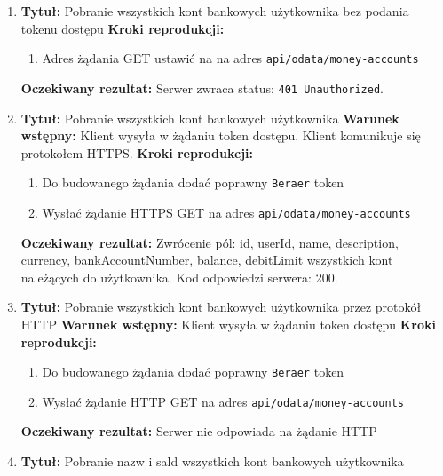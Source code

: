 \begin{enumerate}[labelwidth=1em,label=\Roman*]
\item 
    \textbf{Tytuł:} Pobranie wszystkich kont bankowych użytkownika bez podania tokenu dostępu \newline
    \textbf{Kroki reprodukcji:}  \begin{enumerate}[label=\arabic*.]
        \item Adres żądania GET ustawić na na adres \texttt{api/odata/money-accounts}
    \end{enumerate}
    \textbf{Oczekiwany rezultat:}  Serwer zwraca status: \texttt{401 Unauthorized}. \newline
\item 
    \textbf{Tytuł:} Pobranie wszystkich kont bankowych użytkownika \newline
    \textbf{Warunek wstępny:} Klient wysyła w żądaniu token dostępu. Klient komunikuje się protokołem HTTPS. \newline
    \textbf{Kroki reprodukcji:}  \begin{enumerate}[label=\arabic*.]
        \item Do budowanego żądania dodać poprawny \texttt{Beraer} token 
        \item Wysłać żądanie HTTPS GET na adres \texttt{api/odata/money-accounts}
    \end{enumerate}
    \textbf{Oczekiwany rezultat:}  Zwrócenie pól: id, userId, name, description, currency, bankAccountNumber, balance, debitLimit wszystkich kont należących do użytkownika. Kod odpowiedzi serwera: 200. \newline
\item 
    \textbf{Tytuł:} Pobranie wszystkich kont bankowych użytkownika przez protokół HTTP  \newline
    \textbf{Warunek wstępny:} Klient wysyła w żądaniu token dostępu \newline
    \textbf{Kroki reprodukcji:}  \begin{enumerate}[label=\arabic*.]
        \item Do budowanego żądania dodać poprawny \texttt{Beraer} token 
        \item Wysłać żądanie HTTP GET na adres \texttt{api/odata/money-accounts}
    \end{enumerate}
    \textbf{Oczekiwany rezultat:}  Serwer nie odpowiada na żądanie HTTP \newline
\item 
    \textbf{Tytuł:} Pobranie nazw i sald wszystkich kont bankowych użytkownika \newline

\end{enumerate}
